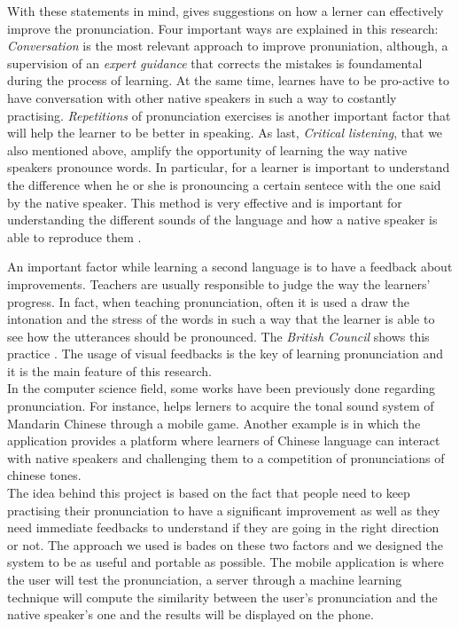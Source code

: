 \noindent With these statements in mind, \cite{gilakjani2011pronunciation} gives suggestions on how a lerner can effectively improve the pronunciation. Four important ways are explained in this research: \textit{Conversation} is the most relevant approach to improve pronuniation, although, a supervision of an \textit{expert guidance} that corrects the mistakes is foundamental during the process of learning. At the same time, learnes have to be pro-active to have conversation with other native speakers in such a way to costantly practising. \textit{Repetitions} of pronunciation exercises is another important factor that will help the learner to be better in speaking. As last, \textit{Critical listening}, that we also mentioned above, amplify the opportunity of learning the way native speakers pronounce words. In particular, for a learner is important to understand the difference when he or she is pronouncing a certain sentece with the one said by the native speaker. This method is very effective and is important for understanding the different sounds of the language and how a native speaker is able to reproduce them \cite{rost2014listening}.

\noindent An important factor while learning a second language is to have a feedback about improvements. Teachers are usually responsible to judge the way the learners' progress. In fact, when teaching pronunciation, often it is used a draw the intonation and the stress of the words in such a way that the learner is able to see how the utterances should be pronounced. The \textit{British Council} shows this practice \cite{bbc_stress}. The usage of visual feedbacks is the key of learning pronunciation and it is the main feature of this research. \\

\noindent In the computer science field, some works have been previously done regarding pronunciation. For instance, \cite{edge2012tip} helps lerners to acquire the tonal sound system of Mandarin Chinese through a mobile game. Another example is \cite{head2014tonewars} in which the application provides a platform where learners of Chinese language can interact with native speakers and challenging them to a competition of pronunciations of chinese tones. \\

\noindent The idea behind this project is based on the fact that people need to keep practising their pronunciation to have a significant improvement as well as they need immediate feedbacks to understand if they are going in the right direction or not. The approach we used is bades on these two factors and we designed the system to be as useful and portable as possible. The mobile application is where the user will test the pronunciation, a server through a machine learning technique will compute the similarity between the user's pronunciation and the native speaker's one and the results will be displayed on the phone. \\

